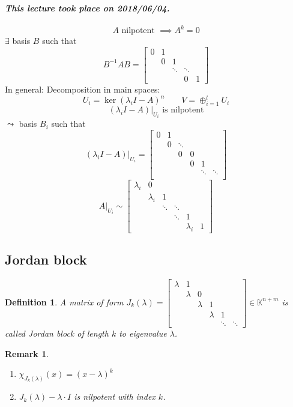 \documentclass{article}
\newtheorem{definition}{Definition}  \numberwithin{definition}{section}
\newtheorem{remark}{Remark}  \numberwithin{remark}{section}
\newcommand{\dateref}[1]{\paragraph{\textit{This lecture took place on #1.}}}
\begin{document}
\dateref{2018/06/04}

\[ A \text{ nilpotent } \implies A^k = 0 \]
$\exists$ basis $B$ such that 
\[ B^{-1}AB = \begin{bmatrix} 0 & 1 & & & \\ & 0 & 1 & & \\ & & \ddots & \ddots & \\ & & & 0 & 1 \end{bmatrix} \]
In general:
Decomposition in main spaces:
\[ U_i = \ker(\lambda_i I - A)^n \qquad V = \oplus_{i=1}^l U_i \] %
\[ (\lambda_i I - A)|_{U_i} \text{ is nilpotent} \]
$\leadsto$ basis $B_i$ such that
\[ (\lambda_i I - A)|_{U_i} = \begin{bmatrix}
  0 & 1 & & & & \\
  & 0 & \ddots & & & \\
  & & 0 & 0 & & \\
  & & & 0 & 1 & \\
  & & & & \ddots & \ddots \\
\end{bmatrix} \]
\[
  A|_{U_i} \sim
  \begin{bmatrix}
    \lambda_i & 0 & & & & \\
    & \lambda_i & 1 & & & \\
    & & \ddots & \ddots & & \\
    & & & \ddots & 1 & \\
    & & & & \lambda_i & 1
  \end{bmatrix}
\]

\subsection{Jordan block}

\begin{definition} %
  A matrix of form $J_k(\lambda) = \begin{bmatrix}
    \lambda & 1 & & & & \\
    & \lambda & 0 & & & \\
    & & \lambda & 1 & & \\
    & & & \lambda & 1 & \\
    & & & & \ddots & \ddots
  \end{bmatrix} \in \mathbb K^{n+m}$
  is called \emph{Jordan block} of length $k$ to eigenvalue $\lambda$.
\end{definition}

\begin{remark}
  \begin{enumerate}
    \item $\chi_{J_k(\lambda)}(x) = (x - \lambda)^k$
    \item $J_k(\lambda) - \lambda \cdot I$ is nilpotent with index $k$.
  \end{enumerate}
\end{remark}
\end{document}
